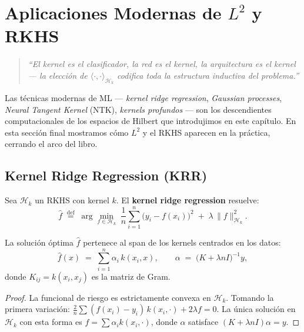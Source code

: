 \newpage
\section{Aplicaciones Modernas de $L^2$ y RKHS}

\begin{quotation}
	\itshape
	``El kernel es el clasificador, la red es el kernel, la arquitectura es el kernel --- la elecci\'on de $\langle\cdot,\cdot\rangle_{\mathcal{H}_k}$ codifica toda la estructura inductiva del problema.''
\end{quotation}

Las t\'ecnicas modernas de ML --- \emph{kernel ridge regression}, \emph{Gaussian processes}, \emph{Neural Tangent Kernel} (NTK), \emph{kernels profundos} --- son los descendientes computacionales de los espacios de Hilbert que introdujimos en este cap\'itulo.  En esta secci\'on final mostramos c\'omo $L^2$ y el RKHS aparecen en la pr\'actica, cerrando el arco del libro.

\subsection*{Kernel Ridge Regression (KRR)}

\begin{definition}
	Sea $\mathcal{H}_k$ un RKHS con kernel $k$.  El \textbf{kernel ridge regression} resuelve:
	\[
	\hat{f} \;\stackrel{\text{def}}{=}\; \arg\min_{f \in \mathcal{H}_k}\; \frac{1}{n} \sum_{i=1}^n \bigl(y_i - f(x_i)\bigr)^2 \;+\; \lambda\,\|f\|_{\mathcal{H}_k}^2.
	\]
\end{definition}

\begin{theorem}
	La soluci\'on \'optima $\hat{f}$ pertenece al span de los kernels centrados en los datos:
	\[
	\hat{f}(x) \;=\; \sum_{i=1}^n \alpha_i\, k(x_i, x), \qquad \alpha \;=\; \bigl(K + \lambda n I\bigr)^{-1} y,
	\]
	donde $K_{ij} = k(x_i, x_j)$ es la matriz de Gram.
\end{theorem}

\begin{proof}
	La funcional de riesgo es estrictamente convexa en $\mathcal{H}_k$.  Tomando la primera variaci\'on: $\frac{2}{n}\sum (f(x_i)-y_i)\,k(x_i,\cdot) + 2\lambda f = 0$.  La \'unica soluci\'on en $\mathcal{H}_k$ con esta forma es $f = \sum \alpha_i k(x_i,\cdot)$, donde $\alpha$ satisface $(K + \lambda n I)\alpha = y$.
\end{proof}

